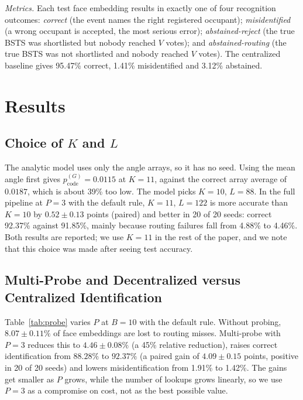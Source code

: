 \documentclass[pdflatex,sn-mathphys-num]{sn-jnl}%
\theoremstyle{thmstyleone}%
\theoremstyle{thmstyletwo}%
\theoremstyle{thmstylethree}%
\begin{document}
\emph{Metrics.} Each test face embedding results in exactly one of four recognition outcomes: \emph{correct} (the event names the right registered occupant); \emph{misidentified} (a wrong occupant is accepted, the most serious error); \emph{abstained-reject} (the true BSTS was shortlisted but nobody reached $V$ votes); and \emph{abstained-routing} (the true BSTS was not shortlisted and nobody reached $V$ votes). The centralized baseline gives 95.47\% correct, 1.41\% misidentified and 3.12\% abstained.

\section{Results}
\label{sec:results}

\subsection{Choice of $K$ and $L$}
\label{sec:k1011}

The analytic model uses only the angle arrays, so it has no seed. Using the mean angle first gives
$p_{\text{code}}^{(G)}=0.0115$ at $K=11$, against the correct array average of $0.0187$, which is about
39\% too low. The model picks $K=10$, $L=88$. In the full pipeline at $P=3$ with the default rule, $K=11$,
$L=122$ is more accurate than $K=10$ by $0.52 \pm 0.13$ points (paired) and better in 20 of 20 seeds: correct
92.37\% against 91.85\%, mainly because routing failures fall from 4.88\% to 4.46\%. Both results are reported; we use
$K=11$ in the rest of the paper, and we note that this choice was made after seeing test accuracy.

\subsection{Multi-Probe and Decentralized versus Centralized Identification}

Table~\ref{tab:probe} varies $P$ at $B=10$ with the default rule. Without probing, $8.07 \pm 0.11\%$ of face embeddings are lost
to routing misses. Multi-probe with $P=3$ reduces this to $4.46 \pm 0.08\%$ (a 45\% relative reduction), raises
correct identification from $88.28\%$ to $92.37\%$ (a paired gain of $4.09 \pm 0.15$ points, positive in
20 of 20 seeds) and lowers misidentification from 1.91\% to 1.42\%. The gains get smaller as $P$
grows, while the number of lookups grows linearly, so we use $P=3$ as a compromise on cost, not as the best possible
value.
\end{document}
